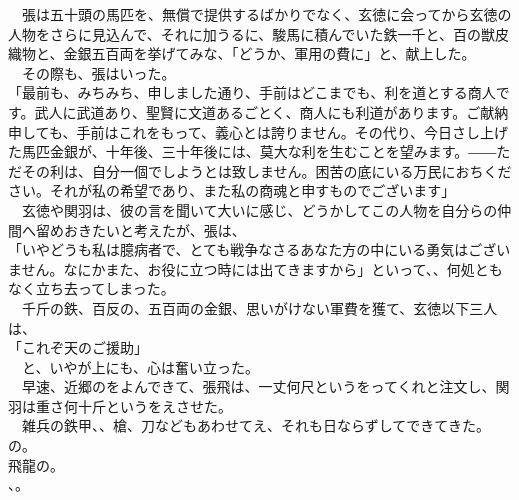 \documentclass[
  paper=a5,
  fontsize=10pt,
  jafontsize=9.5pt,
  tate,                  %
  open_bracket_pos=nibu, %
]{jlreq}
\begin{document}
　張は五十頭の馬匹を、無償で提供するばかりでなく、玄徳に会ってから玄徳の人物をさらに見込んで、それに加うるに、駿馬に積んでいた鉄一千と、百の獣皮織物と、金銀五百両を挙げてみな、「どうか、軍用の費に」と、献上した。\\


　その際も、張はいった。\\


「最前も、みちみち、申しました通り、手前はどこまでも、利を道とする商人です。武人に武道あり、聖賢に文道あるごとく、商人にも利道があります。ご献納申しても、手前はこれをもって、義心とは誇りません。その代り、今日さし上げた馬匹金銀が、十年後、三十年後には、莫大な利を生むことを望みます。――ただその利は、自分一個でしようとは致しません。困苦の底にいる万民におちください。それが私の希望であり、また私の商魂と申すものでございます」\\


　玄徳や関羽は、彼の言を聞いて大いに感じ、どうかしてこの人物を自分らの仲間へ留めおきたいと考えたが、張は、\\


「いやどうも私は臆病者で、とても戦争なさるあなた方の中にいる勇気はございません。なにかまた、お役に立つ時には出てきますから」といって、、何処ともなく立ち去ってしまった。\\


　千斤の鉄、百反の、五百両の金銀、思いがけない軍費を獲て、玄徳以下三人は、\\


「これぞ天のご援助」\\


　と、いやが上にも、心は奮い立った。\\


　早速、近郷のをよんできて、張飛は、一丈何尺というをってくれと注文し、関羽は重さ何十斤というをえさせた。\\


　雑兵の鉄甲、、槍、刀などもあわせてえ、それも日ならずしてできてきた。\\

の。\\


飛龍の。\\

、。\\
\end{document}
